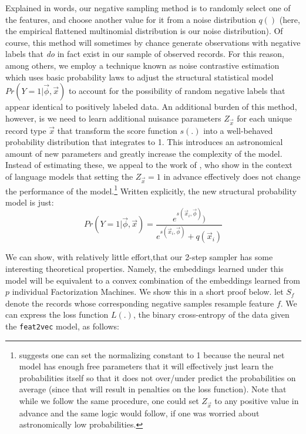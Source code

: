 \documentclass{article} %
\renewcommand{\cite}[1]{\citep{#1}}
\begin{document}
Explained in words, our negative sampling method is to randomly select one of the features, and choose another value for it from a noise distribution $q()$ (here, the empirical flattened multinomial distribution is our noise distribution). Of course, this method will sometimes by chance generate observations with negative labels that \textit{do} in fact exist in our sample of observed records. For this reason, among others, we employ  a technique known as noise contrastive estimation\cite{nce} which uses basic probability laws to adjust the structural statistical model $Pr(Y=1|\vec{\phi},\vec{x})$ to account for the possibility of random negative labels that appear identical to positively labeled data. An additional burden of this method, however, is we need to learn additional nuisance parameters $Z_{\vec{x}}$ for each unique record type $\vec{x}$ that transform the score function $s(.)$ into a well-behaved probability distribution that integrates to 1. This introduces an astronomical amount of new parameters and greatly increase the complexity of the model. Instead of estimating these, we appeal to the work of \cite{fastnnlang}, who show in the context of language models that setting the $Z_{\vec{x}}=1$ in advance effectively does not change the performance of the model.\footnote{\cite{fastnnlang} suggests one can set the normalizing constant to 1 because the neural net model has enough free parameters that it will effectively just learn the probabilities itself so that it does not over/under predict the probabilities on average (since that will result in penalties on the loss function). Note that while we follow the same procedure, one could set $Z_{\vec{x}}$ to any positive value in advance and the same logic would follow, if one was worried about astronomically low probabilities.}  Written explicitly, the new structural probability model is just:
\[Pr(Y=1|\vec{\phi},\vec{x}) = \frac{e^{s(\vec{x}_i,\vec{\phi}) })}{e^{s(\vec{x}_i,\vec{\phi}) } + q(\vec{x}_i) }\]

We can show, with relatively little effort,that our 2-step sampler has some interesting theoretical properties. Namely, the embeddings learned under this model will be equivalent to a convex combination of the embeddings learned from $p$ individual Factorization Machines. We show this in a short proof below. let $S_f$ denote the records whose corresponding negative samples resample feature $f$. We can express the loss function $L(.)$, the binary cross-entropy of the data given the \texttt{feat2vec} model, as follows:
\end{document}
